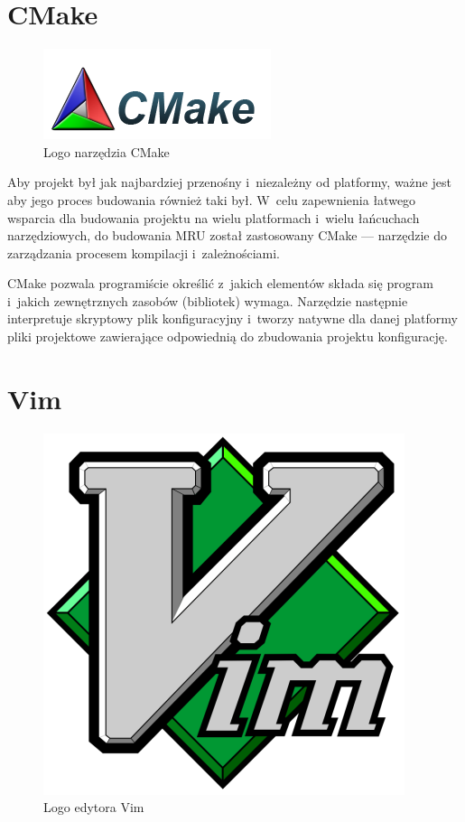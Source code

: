 \section{CMake}
\begin{figure}
\begin{center}
\includegraphics[scale=0.75]{img/cmake_logo.png}
\end{center}
\caption{Logo narzędzia CMake}
\end{figure}

\par
Aby projekt był jak najbardziej przenośny i~niezależny od platformy, ważne jest aby jego proces budowania również taki był.
 W~celu zapewnienia łatwego wsparcia dla budowania projektu na wielu platformach i~wielu łańcuchach narzędziowych, do budowania MRU został zastosowany CMake --- narzędzie do zarządzania procesem kompilacji i~zależnościami.
\par
CMake pozwala programiście określić z~jakich elementów składa się program i~jakich zewnętrznych zasobów (bibliotek) wymaga. Narzędzie następnie interpretuje skryptowy plik konfiguracyjny i~tworzy natywne dla danej platformy pliki projektowe zawierające odpowiednią do zbudowania projektu konfigurację.

\section{Vim}
\begin{figure}
\begin{center}
\includegraphics[scale=0.25]{img/vim_logo.png}
\end{center}
\caption{Logo edytora Vim}
\end{figure}

